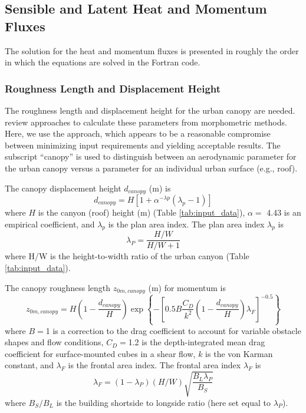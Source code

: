 \documentclass[12pt,authoryear]{elsarticle}
\numberwithin{equation}{section} %
\begin{document}
\subsection{Sensible and Latent Heat and Momentum Fluxes}
The solution for the heat and momentum fluxes is presented in roughly the order in which the equations are solved in the Fortran code.

\subsubsection{Roughness Length and Displacement Height}
%
The roughness length and displacement height for the urban canopy are needed. \cite{grimmondAerodynamicPropertiesUrban1999} review approaches to calculate these parameters from morphometric methods. Here, we use the \cite{macdonaldImprovedMethodEstimation1998a} approach, which appears to be a reasonable compromise between minimizing input requirements and yielding acceptable results. The subscript ``canopy'' is used to distinguish between an aerodynamic parameter for the urban canopy versus a parameter for an individual urban surface (e.g., roof).

The canopy displacement height $d_{canopy}$ (m) is
\begin{equation}
d_{canopy} = H\left[1+\alpha^{-\lambda p}(\lambda_p-1)\right]
\end{equation}
where $H$ is the canyon (roof) height (m) (Table \ref{tab:input_data}), $\alpha=$ 4.43 is an empirical coefficient, and $\lambda_{p}$ is the plan area index. The plan area index $\lambda_{p}$ is
\begin{equation}
\lambda_{P}=\frac{H/W}{H/W+1}
\end{equation}
where H/W is the height-to-width ratio of the urban canyon (Table \ref{tab:input_data}).

The canopy roughness length $z_{0m,canopy}$ (m) for momentum is 
\begin{equation}
z_{0m,canopy}=H\left(1-\frac{d_{canopy}}{H}\right) \exp \left\{-\left[0.5B\frac{C_{D}}{k^2}\left(1-\frac{d_{canopy}}{H}\right)\lambda_{F}\right]^{-0.5}\right\}
\end{equation}
where $B=$1 is a correction to the drag coefficient to account for variable obstacle shapes and flow conditions, $C_{D}=$1.2 is the depth-integrated mean drag coefficient for surface-mounted cubes in a shear flow, $k$ is the von Karman constant, and $\lambda_{F}$ is the frontal area index. The frontal area index $\lambda_{F}$ is
\begin{equation}
\lambda_{F}=(1-\lambda_{P})(H/W)\sqrt{\frac{B_{L}\lambda_{P}}{B_{S}}}
\end{equation}
where $B_{S}/B_{L}$ is the building shortside to longside ratio (here set equal to $\lambda_{P}$).
\end{document}
